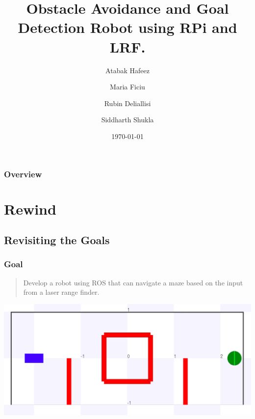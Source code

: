\documentclass{beamer}
\title[Design Phase]{Obstacle Avoidance and Goal Detection Robot using RPi and LRF.} %
\author{Atabak Hafeez \and
Maria Ficiu \and
Rubin Deliallisi \and
Siddharth Shukla} %
\institute[Jacobs University Bremen] %
{
Jacobs University Bremen \\ %
\medskip
}
\date{\today} %
\begin{document}
\begin{frame}
\titlepage %
\end{frame}

\begin{frame}
\frametitle{Overview} %
\tableofcontents %
\end{frame}



\section{Rewind}

\subsection{Revisiting the Goals}
\begin{frame}
\frametitle{Goal}
\begin{quote}
Develop a robot using ROS that can navigate a maze based on the input from a laser range finder. 
\end{quote}
\includegraphics[scale=0.25]{assets/images/Visualization.png} 
\end{frame}
\end{document}
